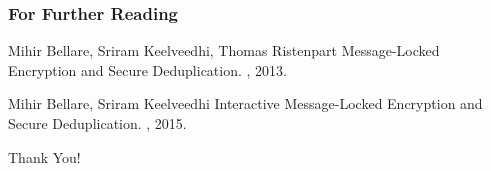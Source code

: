 \documentclass{beamer}
\begin{document}
\begin{frame}%
  \frametitle<presentation>{For Further Reading}
    
  \begin{thebibliography}{10}
    
%
% 
    
  \beamertemplatearticlebibitems

    Mihir Bellare, Sriram Keelveedhi, Thomas Ristenpart
    \newblock Message-Locked Encryption and Secure Deduplication.
    , 2013.
  
    Mihir Bellare, Sriram Keelveedhi
    \newblock Interactive Message-Locked Encryption and Secure Deduplication.
    , 2015.
  \end{thebibliography}
\end{frame}

\begin{frame}{}
\centering
	\fontsize{20pt}{7.2}\selectfont
	Thank You!
\end{frame}
\end{document}
